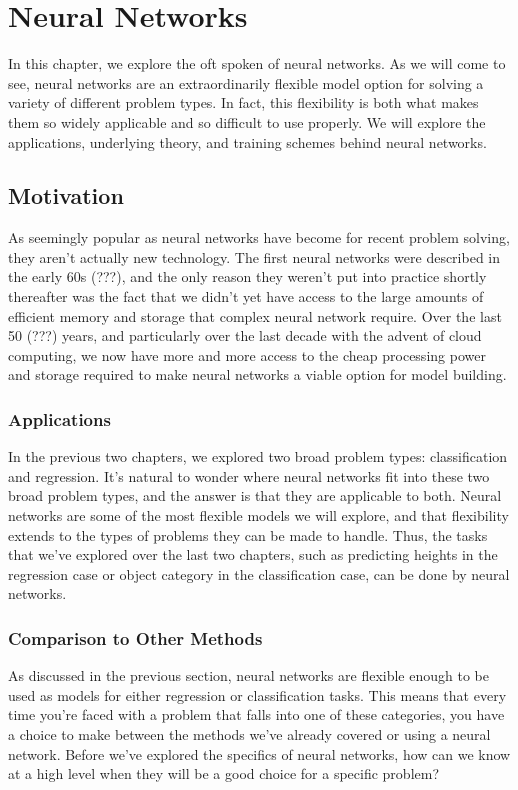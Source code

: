 \chapter{Neural Networks}
In this chapter, we explore the oft spoken of neural networks. As we will come to see, neural networks are an extraordinarily flexible model option for solving a variety of different problem types. In fact, this flexibility is both what makes them so widely applicable and so difficult to use properly. We will explore the applications, underlying theory, and training schemes behind neural networks.

\section{Motivation}
As seemingly popular as neural networks have become for recent problem solving, they aren't actually new technology. The first neural networks were described in the early 60s (???), and the only reason they weren't put into practice shortly thereafter was the fact that we didn't yet have access to the large amounts of efficient memory and storage that complex neural network require. Over the last 50 (???) years, and particularly over the last decade with the advent of cloud computing, we now have more and more access to the cheap processing power and storage required to make neural networks a viable option for model building.

\subsection{Applications}
In the previous two chapters, we explored two broad problem types: classification and regression. It's natural to wonder where neural networks fit into these two broad problem types, and the answer is that they are applicable to both. Neural networks are some of the most flexible models we will explore, and that flexibility extends to the types of problems they can be made to handle. Thus, the tasks that we've explored over the last two chapters, such as predicting heights in the regression case or object category in the classification case, can be done by neural networks.

\subsection{Comparison to Other Methods}
As discussed in the previous section, neural networks are flexible enough to be used as models for either regression or classification tasks. This means that every time you're faced with a problem that falls into one of these categories, you have a choice to make between the methods we've already covered or using a neural network. Before we've explored the specifics of neural networks, how can we know at a high level when they will be a good choice for a specific problem?

